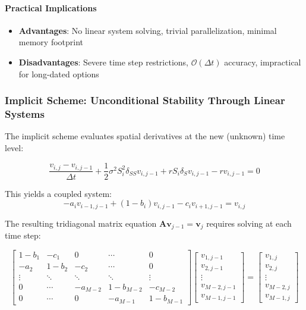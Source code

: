 \documentclass[11pt,a4paper]{article}
\begin{document}
\paragraph{Practical Implications}
\begin{itemize}
\item \textbf{Advantages}: No linear system solving, trivial parallelization, minimal memory footprint
\item \textbf{Disadvantages}: Severe time step restrictions, $\mathcal{O}(\Delta t)$ accuracy, impractical for long-dated options
\end{itemize}

\subsubsection{Implicit Scheme: Unconditional Stability Through Linear Systems}

The implicit scheme evaluates spatial derivatives at the new (unknown) time level:

\begin{equation}
\frac{v_{i,j} - v_{i,j-1}}{\Delta t} + \frac{1}{2}\sigma^2 S_i^2 \delta_{SS}v_{i,j-1} + rS_i\delta_S v_{i,j-1} - rv_{i,j-1} = 0
\end{equation}

This yields a coupled system:
\begin{equation}
-a_i v_{i-1,j-1} + (1 - b_i)v_{i,j-1} - c_i v_{i+1,j-1} = v_{i,j}
\end{equation}

The resulting tridiagonal matrix equation $\mathbf{A}\mathbf{v}_{j-1} = \mathbf{v}_j$ requires solving at each time step:

\begin{equation}
\begin{bmatrix}
1-b_1 & -c_1 & 0 & \cdots & 0 \\
-a_2 & 1-b_2 & -c_2 & \cdots & 0 \\
\vdots & \ddots & \ddots & \ddots & \vdots \\
0 & \cdots & -a_{M-2} & 1-b_{M-2} & -c_{M-2} \\
0 & \cdots & 0 & -a_{M-1} & 1-b_{M-1}
\end{bmatrix}
\begin{bmatrix}
v_{1,j-1} \\ v_{2,j-1} \\ \vdots \\ v_{M-2,j-1} \\ v_{M-1,j-1}
\end{bmatrix} = \begin{bmatrix}
v_{1,j} \\ v_{2,j} \\ \vdots \\ v_{M-2,j} \\ v_{M-1,j}
\end{bmatrix}
\end{equation}
\end{document}

